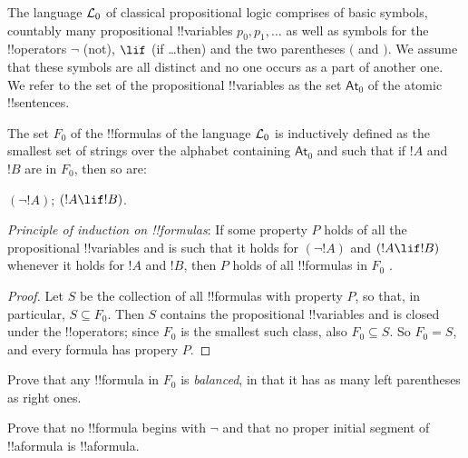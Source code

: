 \documentclass[../../include/open-logic-section]{subfiles}
\begin{document}


The language $\mathcal L_0$ of classical propositional logic
comprises of basic symbols, countably many propositional !!{variable}s
$p_0, p_1,\ldots$ as well as symbols for the !!{operator}s $\lnot$
(not), $\lif$ (if \dots then) and the two parentheses $($ and
$)$. We assume that these symbols are all distinct and no one occurs as
a part of another one. We refer to the set of the propositional
!!{variable}s as the set $\mathsf{At}_0$ of the atomic !!{sentence}s.

\begin{defn} [Formulas]
The set $F_0$ of the !!{formula}s of the language
  $\mathcal L_0$ is inductively defined as the smallest set of strings
  over the alphabet containing $\mathsf{At}_0$ and such that
  if $!A$ and $!B$ are in $F_0$, then so are:
\begin{enumerate}
 {$(\lnot !A)$;}{}
 {$(!A \lif !B)$.}{}
\end{enumerate}
\end{defn}     
                        
\begin{thm} 
\emph{Principle of induction on !!{formula}s}: If some
  property $P$ holds of all the propositional !!{variable}s and is such
  that it holds for $(\lnot !A)$ and $(!A \lif !B)$
  whenever it holds for $!A$ and $!B$, then $P$ holds of all
 !!{formula}s in $F_0$ .
\end{thm}

\begin{proof}
  Let $S$ be the collection of all !!{formula}s with property $P$, so
  that, in particular, $S\subseteq F_0$. Then $S$ contains
  the propositional !!{variable}s and is closed under the !!{operator}s;
  since $F_0$ is the smallest such class, also
  $F_0\subseteq S$. So $F_0 = S$, and every
  formula has propery $P$.
\end{proof}

\begin{prob} Prove that any !!{formula} in $F_0$ is \emph{balanced}, in
that
  it has as many left parentheses as right ones.
\end{prob}

\begin{prob} Prove that no
  !!{formula} begins with $\lnot$ and that no proper initial segment of
  !!a{formula} is !!a{formula}.
\end{prob}
\end{document}
